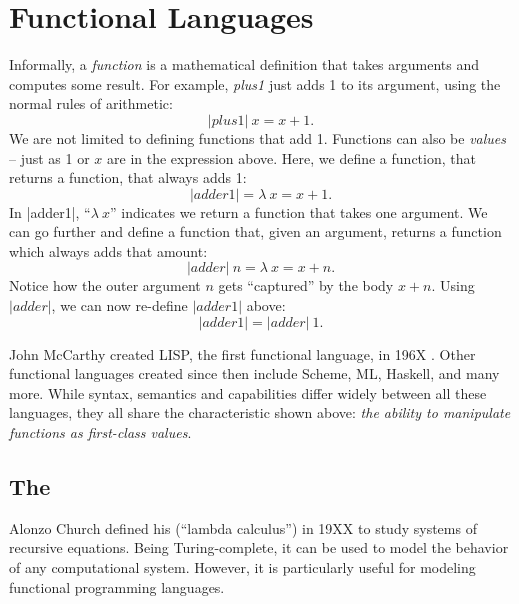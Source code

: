 \documentclass[12pt]{report}
\begin{document}


\chapter{Functional Languages}
\label{ref_chapter_languages}
Informally, a \emph{function} is a mathematical definition that takes
arguments and computes some result. For example, \emph{plus1} just adds 1 
to its argument, using the normal rules of arithmetic:
\begin{equation}
  |plus1|\ x = x + 1.
\end{equation}
We are not limited to defining functions that add 1. Functions can
also be \emph{values} -- just as 1 or $x$ are in the expression
above. Here, we define a function, that returns a function, that always
adds 1:
\begin{equation}
  |adder1| = \lambda\ x = x + 1.
\end{equation}
In |adder1|, ``$\lambda\ x$'' indicates we return a function that takes one
argument. We can go further and define a function that, given an
argument, returns a function which always adds that amount:
\begin{equation}
  |adder|\ n = \lambda\ x = x + n.
\end{equation}
Notice how the outer argument $n$ gets ``captured'' by the body $x +
n$. Using $|adder|$, we can now re-define $|adder1|$ above:
\begin{equation}
  |adder1| = |adder|\ 1.
\end{equation}

John McCarthy created LISP, the first functional language, in 196X
\citep{McCarthyXX}. Other functional languages created since then include 
Scheme, ML, Haskell, and many more. While syntax, semantics and capabilities
differ widely between all these languages, they all share the characteristic
shown above: \emph{the ability to manipulate functions as first-class values}.

\section{The \LamA}


Alonzo Church defined his \lamA (``lambda calculus'') in 19XX
\citep{ChurchXX} to study systems of recursive equations. Being
Turing-complete, it can be used to model the behavior of any
computational system. However, it is particularly useful for modeling
functional programming languages. %
\end{document}
